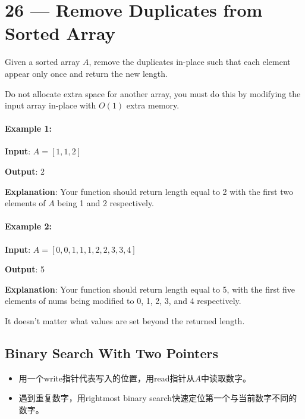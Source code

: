 \section{26 --- Remove Duplicates from Sorted Array}

Given a sorted array $A$, remove the duplicates in-place such that each element appear only once and return the new length.

Do not allocate extra space for another array, you must do this by modifying the input array in-place with $O(1)$ extra memory.

\paragraph{Example 1:}

\begin{flushleft}
\textbf{Input}: $A = [1,1,2]$

\textbf{Output}: 2

\textbf{Explanation}: Your function should return length equal to 2 with the first two elements of $A$ being 1 and 2 respectively.
\end{flushleft}

\paragraph{Example 2:}

\begin{flushleft}
\textbf{Input}: $A = [0,0,1,1,1,2,2,3,3,4]$

\textbf{Output}: 5

\textbf{Explanation}: 
Your function should return length equal to 5, with the first five elements of nums being modified to 0, 1, 2, 3, and 4 respectively. 

It doesn't matter what values are set beyond the returned length.
\end{flushleft}

\subsection{Binary Search With Two Pointers}
\begin{itemize}
\item 用一个write指针代表写入的位置，用read指针从$A$中读取数字。
\item 遇到重复数字，用rightmost binary search快速定位第一个与当前数字不同的数字。
\end{itemize}

